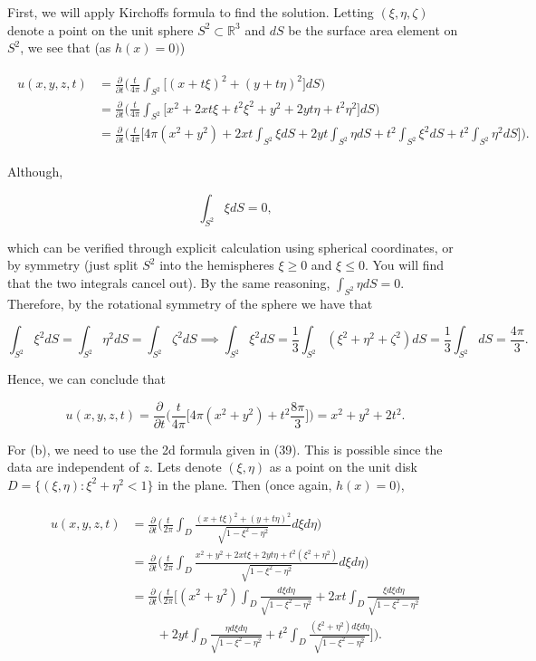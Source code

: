 \documentclass{article}
\begin{document}
First, we will apply Kirchoff\textsc{}s formula to find the solution. Letting $(\xi,\eta,\zeta)$ denote a point on the unit sphere $S^2\subset\mathbb R^3$ and $dS$ be the surface area element on $S^2$, we see that (as $h(x)=0)$)

\begin{align*}
\begin{split}
u(x,y,z,t)&=\frac{\partial}{\partial t}\Bigg(\frac{t}{4\pi}\int_{S^2}\Big[(x+t\xi)^2+(y+t\eta)^2\Big]dS\Bigg) \\ &=
\frac{\partial}{\partial t}\Bigg(\frac{t}{4\pi}\int_{S^2}\Big[x^2+2xt\xi+t^2\xi^2+y^2+2yt\eta+t^2\eta^2]dS\Bigg) \\ &=
\frac{\partial}{\partial t}\Bigg(\frac{t}{4\pi}\Big[4\pi(x^2+y^2)+2xt\int_{S^2}\xi dS + 2yt \int_{S^2}\eta dS + t^2\int_{S^2}\xi^2 dS +  t^2\int_{S^2}\eta^2 dS\Big]\Bigg).
\end{split}    
\end{align*}

Although,

$$\int_{S^2}\xi dS=0,$$

which can be verified through explicit calculation using spherical coordinates, or by symmetry (just split $S^2$ into the hemispheres $\xi\geq 0$ and $\xi\leq 0$. You will find that the two integrals cancel out). By the same reasoning, $\int_{S^2}\eta dS=0$. Therefore, by the rotational symmetry of the sphere we have that

$$\int_{S^2}\xi^2 dS=\int_{S^2}\eta^2 dS=\int_{S^2}\zeta^2 dS \implies \int_{S^2}\xi^2 dS=\frac{1}{3}\int_{S^2}(\xi^2+\eta^2+\zeta^2)dS=\frac{1}{3}\int_{S^2}dS=\frac{4\pi}{3}.$$

Hence, we can conclude that

$$u(x,y,z,t)=\frac{\partial}{\partial t}\Bigg(\frac{t}{4\pi}\Big[4\pi(x^2+y^2)+t^2\frac{8\pi}{3}\Big]\Bigg)=x^2+y^2+2t^2.$$

For (b), we need to use the 2d formula given in (39). This is possible since the data are independent of $z$. Let\textsc{}s denote $(\xi,\eta)$ as a point on the unit disk $D = \{(\xi,\eta) : \xi^2 + \eta^2 < 1\}$ in the plane. Then (once again, $h(x)=0)$,

\begin{align*}
\begin{split}
u(x,y,z,t)&=\frac{\partial}{\partial t}\Bigg(\frac{t}{2\pi}\int_{D}\frac{(x+t\xi)^2+(y+t\eta)^2}{\sqrt{1-\xi^2-\eta^2}}d\xi d\eta\Bigg) \\ &=
\frac{\partial}{\partial t}\Bigg(\frac{t}{2\pi}\int_{D}\frac{x^2+y^2+2xt\xi+2yt\eta+t^2(\xi^2+\eta^2) }{\sqrt{1-\xi^2-\eta^2}}d\xi d\eta\Bigg) \\ &=
\frac{\partial}{\partial t}\Bigg(\frac{t}{2\pi}\Bigg[(x^2+y^2)\int_{D}\frac{d\xi d\eta}{\sqrt{1-\xi^2-\eta^2}}+2xt\int_{D}\frac{\xi d\xi d\eta}{\sqrt{1-\xi^2-\eta^2}}\\ 
&~~~~~~~~~+2yt\int_{D}\frac{\eta d\xi d\eta}{\sqrt{1-\xi^2-\eta^2}}+t^2\int_{D}\frac{(\xi^2+\eta^2) d\xi d\eta}{\sqrt{1-\xi^2-\eta^2}}\Bigg]\Bigg).
\end{split}    
\end{align*}
\end{document}
